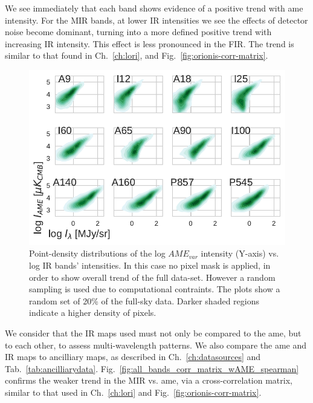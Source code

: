         We see immediately that each band shows evidence of a positive trend with \acrshort{ame} intensity. For the MIR bands, at lower IR intensities we see the effects of detector noise become dominant, turning into a more defined positive trend with increasing IR intensity. This effect is less pronounced in the FIR. The trend is similar to that found in Ch.~\ref{ch:lori}, and Fig.~\ref{fig:orionis-corr-matrix}.
          \begin{figure}
            \includegraphics[width=\textwidth]{../Plots/ch_allsky/AMEvsDust_allsky_allbands_mpsub_kde_unmasked.pdf}
            \centering
            \caption{Point-density distributions of the log $AME_{var}$ intensity (Y-axis) vs. log IR bands' intensities. In this case no pixel mask is applied, in order to show overall trend of the full data-set. However a random sampling is used due to computational contraints. The plots show a random set of 20\% of the full-sky data. Darker shaded regions indicate a higher density of pixels.}
            \label{fig:AMEvsDust_allsky_allbands_mpsub_kde_unmasked}
          \end{figure}
        We consider that the IR maps used must not only be compared to the \acrshort{ame}, but to each other, to assess multi-wavelength patterns. We also compare the \acrshort{ame} and IR maps to ancilliary maps, as described in Ch.~\ref{ch:datasources} and Tab.~\ref{tab:ancilliarydata}. Fig.~\ref{fig:all_bands_corr_matrix_wAME_spearman} confirms the weaker trend in the MIR vs. \acrshort{ame}, via a cross-correlation matrix, similar to that used in Ch.~\ref{ch:lori} and Fig.~\ref{fig:orionis-corr-matrix}.
